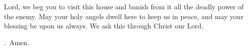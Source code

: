 \lettrine[loversize=0.15,lines=2]{L}{}ord, we beg you to visit this house and banish from it all the deadly power of the enemy. May your holy angels dwell here to keep us in peace, and may your blessing be upon us always. We ask this through Christ our Lord.
\par \Rbar.~Amen.
